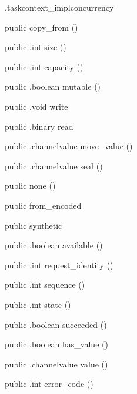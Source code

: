 \begin{CrexxClass}{.taskcontext\_impl}{concurrency}
\begin{Members}
    \Factory
      {public}
      {copy\_from}
      {()}

    \Method
      {public}
      {.int}
      {size}
      {()}

    \Method
      {public}
      {.int}
      {capacity}
      {()}

    \Method
      {public}
      {.boolean}
      {mutable}
      {()}

    \Method
      {public}
      {.void}
      {write}
      {}

    \Method
      {public}
      {.binary}
      {read}
      {}

    \Method
      {public}
      {.channelvalue}
      {move\_value}
      {()}

    \Method
      {public}
      {.channelvalue}
      {seal}
      {()}

    \Factory
      {public}
      {none}
      {()}

    \Factory
      {public}
      {from\_encoded}
      {}

    \Factory
      {public}
      {synthetic}
      {}

    \Method
      {public}
      {.boolean}
      {available}
      {()}

    \Method
      {public}
      {.int}
      {request\_identity}
      {()}

    \Method
      {public}
      {.int}
      {sequence}
      {()}

    \Method
      {public}
      {.int}
      {state}
      {()}

    \Method
      {public}
      {.boolean}
      {succeeded}
      {()}

    \Method
      {public}
      {.boolean}
      {has\_value}
      {()}

    \Method
      {public}
      {.channelvalue}
      {value}
      {()}

    \Method
      {public}
      {.int}
      {error\_code}
      {()}


\end{Members}
\end{CrexxClass}
